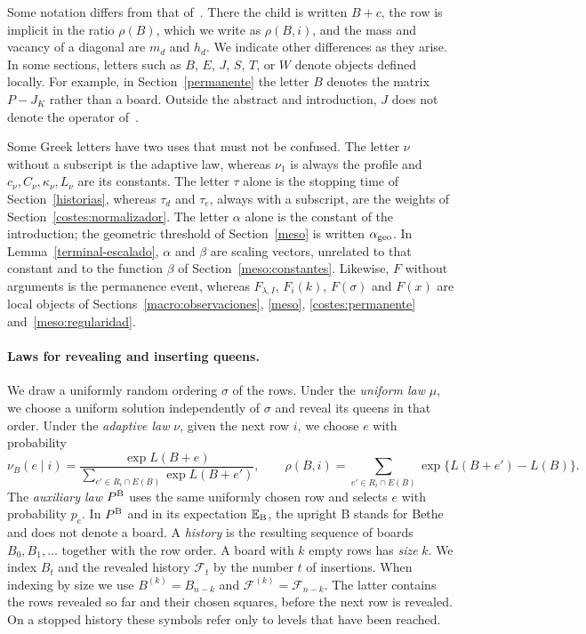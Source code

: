Some notation differs from that of~\cite{pred}. There the child is written $B+c$, the row is implicit in
the ratio $\rho(B)$, which we write as $\rho(B,i)$, and the mass and vacancy of a diagonal are $m_d$ and
$h_d$. We indicate other differences as they arise. In some sections, letters such as $B$, $E$, $J$, $S$,
$T$, or $W$ denote objects defined locally. For example, in Section~\ref{permanente} the letter $B$
denotes the matrix $P-J_K$ rather than a board. Outside the abstract and introduction, $J$ does not denote
the operator of~\cite{pred}.

Some Greek letters have two uses that must not be confused. The letter $\nu$ without a subscript is
the adaptive law, whereas $\nu_1$ is always the profile and $c_\nu,C_\nu,\kappa_\nu,L_\nu$ are its
constants. The letter $\tau$ alone is the stopping time of Section~\ref{historias}, whereas $\tau_d$
and $\tau_e$, always with a subscript, are the weights of Section~\ref{costes:normalizador}. The
letter $\alpha$ alone is the constant of the introduction; the geometric threshold of
Section~\ref{meso} is written $\alpha_{\rm geo}$. In Lemma~\ref{terminal-escalado}, $\alpha$ and
$\beta$ are scaling vectors, unrelated to that constant and to the function $\beta$ of
Section~\ref{meso:constantes}.
Likewise, $F$ without arguments is the permanence event, whereas $F_{\lambda,I}$, $F_i(k)$,
$F(\sigma)$ and $F(x)$ are local objects of Sections~\ref{macro:observaciones}, \ref{meso},
\ref{costes:permanente} and~\ref{meso:regularidad}.

\paragraph{Laws for revealing and inserting queens.}
We draw a uniformly random ordering $\sigma$ of the rows. Under the \emph{uniform law} $\mu$, we choose a
uniform solution independently of $\sigma$ and reveal its queens in that order. Under the \emph{adaptive
law} $\nu$, given the next row $i$, we choose $e$ with probability
\[
 \nu_B(e\mid i)=\frac{\exp L(B+e)}{\sum_{e'\in R_i\cap E(B)}\exp L(B+e')},\qquad
 \rho(B,i)=\sum_{e'\in R_i\cap E(B)}\exp\{L(B+e')-L(B)\}.
\]
The \emph{auxiliary law} $P^{\rm B}$ uses the same uniformly chosen row and selects $e$ with
probability $p_e$. In $P^{\rm B}$ and in its expectation $\mathbb{E}_{\rm B}$, the upright B stands for
Bethe and does not denote a board. A \emph{history} is the resulting sequence of boards
$B_0,B_1,\dots$ together with the row order. A board with $k$ empty rows has \emph{size} $k$.
We index $B_t$ and the revealed history $\mathcal F_t$ by the number $t$ of insertions.
When indexing by size we use $B^{(k)}=B_{n-k}$ and $\mathcal F^{(k)}=\mathcal F_{n-k}$.
The latter contains the rows revealed so far and their chosen squares, before the next row is
revealed. On a stopped history these symbols refer only to levels that have been reached.
